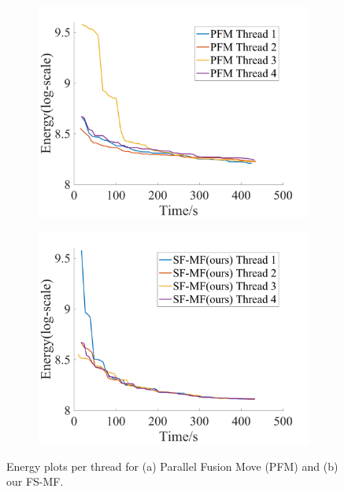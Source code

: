 \begin{figure}[!h]
  \centering
  \begin{subfigure}[b]{0.49\columnwidth}
    \centering
    \includegraphics[width=\columnwidth]{figure/optical_flow_PFM_threads.png}
    \caption{}
    \label{fig:optical_flow_PFM_threads}
  \end{subfigure}  
  \begin{subfigure}[b]{0.49\columnwidth}
    \centering
    \includegraphics[width=\columnwidth]{figure/optical_flow_SF_MF_threads.png}
    \caption{}
    \label{fig:optical_flow_SF_MF_threads}
  \end{subfigure}
  \caption{Energy plots per thread for (a) Parallel Fusion  
    Move (PFM) and (b) our FS-MF.}
  \label{fig:optical_flow_by_threads}  
\end{figure}

